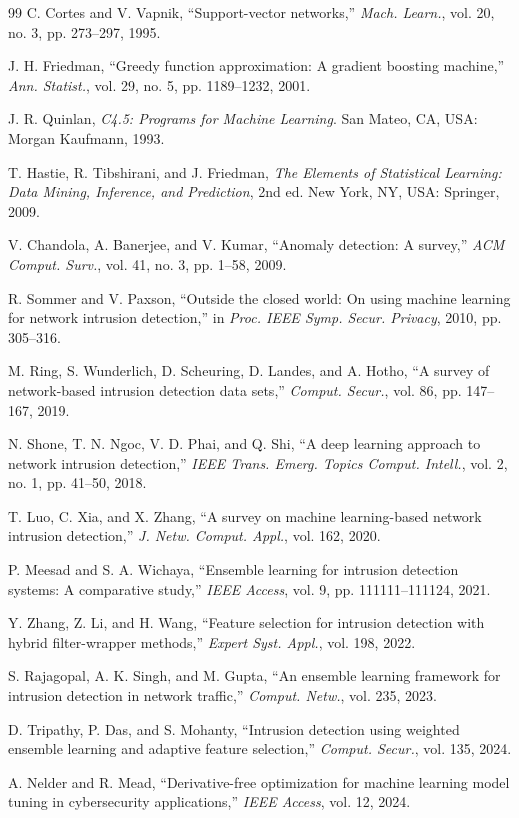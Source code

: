 \documentclass[conference]{IEEEtran}
\begin{document}
\begin{thebibliography}{99}
C. Cortes and V. Vapnik, ``Support-vector networks,'' \textit{Mach. Learn.}, vol. 20, no. 3, pp. 273--297, 1995.

J. H. Friedman, ``Greedy function approximation: A gradient boosting machine,'' \textit{Ann. Statist.}, vol. 29, no. 5, pp. 1189--1232, 2001.

J. R. Quinlan, \textit{C4.5: Programs for Machine Learning}. San Mateo, CA, USA: Morgan Kaufmann, 1993.

T. Hastie, R. Tibshirani, and J. Friedman, \textit{The Elements of Statistical Learning: Data Mining, Inference, and Prediction}, 2nd ed. New York, NY, USA: Springer, 2009.

V. Chandola, A. Banerjee, and V. Kumar, ``Anomaly detection: A survey,'' \textit{ACM Comput. Surv.}, vol. 41, no. 3, pp. 1--58, 2009.

R. Sommer and V. Paxson, ``Outside the closed world: On using machine learning for network intrusion detection,'' in \textit{Proc. IEEE Symp. Secur. Privacy}, 2010, pp. 305--316.

M. Ring, S. Wunderlich, D. Scheuring, D. Landes, and A. Hotho, ``A survey of network-based intrusion detection data sets,'' \textit{Comput. Secur.}, vol. 86, pp. 147--167, 2019.

N. Shone, T. N. Ngoc, V. D. Phai, and Q. Shi, ``A deep learning approach to network intrusion detection,'' \textit{IEEE Trans. Emerg. Topics Comput. Intell.}, vol. 2, no. 1, pp. 41--50, 2018.

T. Luo, C. Xia, and X. Zhang, ``A survey on machine learning-based network intrusion detection,'' \textit{J. Netw. Comput. Appl.}, vol. 162, 2020.

P. Meesad and S. A. Wichaya, ``Ensemble learning for intrusion detection systems: A comparative study,'' \textit{IEEE Access}, vol. 9, pp. 111111--111124, 2021.

Y. Zhang, Z. Li, and H. Wang, ``Feature selection for intrusion detection with hybrid filter-wrapper methods,'' \textit{Expert Syst. Appl.}, vol. 198, 2022.

S. Rajagopal, A. K. Singh, and M. Gupta, ``An ensemble learning framework for intrusion detection in network traffic,'' \textit{Comput. Netw.}, vol. 235, 2023.

D. Tripathy, P. Das, and S. Mohanty, ``Intrusion detection using weighted ensemble learning and adaptive feature selection,'' \textit{Comput. Secur.}, vol. 135, 2024.

A. Nelder and R. Mead, ``Derivative-free optimization for machine learning model tuning in cybersecurity applications,'' \textit{IEEE Access}, vol. 12, 2024.

\end{thebibliography}
\end{document}

